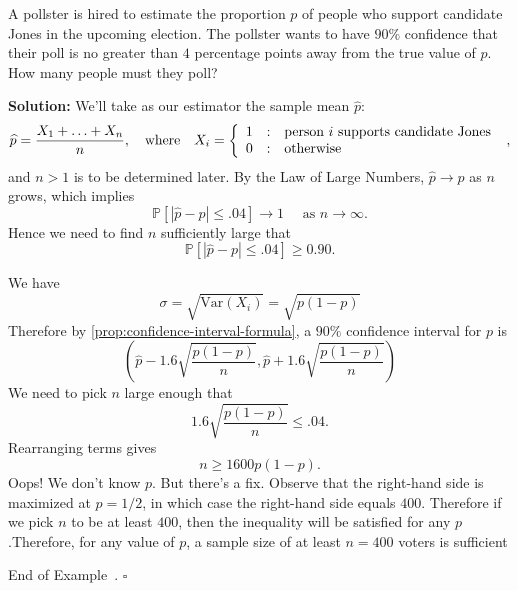 \documentclass[10pt]{article}
\theoremstyle{definition}
\newtheorem{example}[theorem]{Example}
\renewenvironment{example}
{\begin{oldexample}}
  {\par\smallskip\hfill   End of Example~\theexample. $\square$    \par\end{oldexample}}
\newcommand{\vt}{\vskip 5mm} %
\newcommand{\Fl}{\vt\noindent\textbf} %
\newcommand{\1}[1]{\textbf{1}_{\left[#1\right]}} %
\def\P{\mathbb{P}} %
\def\Var{\mathrm{Var}} %
\begin{document}
\begin{example}
  A pollster is hired to estimate the proportion $p$ of people who support
  candidate Jones in the upcoming election. The pollster wants to have $90\%$
  confidence that their poll is no greater than $4$ percentage points away
  from the true value of $p$. How many people must they poll?

  \Fl{Solution:} We'll take as our estimator the sample mean $\widehat{p}$:
  \begin{equation*}
    \widehat{p}=\frac{X_{1}+\ldots+X_{n}}{n},
    \quad \text{where} \quad 
    X_{i} = \left\{ \begin{array}{l@{\quad:\quad}l} 1 & \text{person $i$
          supports candidate Jones }\\0 &\text{otherwise} \end{array}\right.,
  \end{equation*}
  and $n>1$ is to be determined later. By the Law of Large Numbers,
  $\widehat{p} \to p$ as $n$ grows, which implies
  \begin{equation*}
    \P\left[|\widehat{p}-p| \leq .04\right] \to 1 \quad \text{ as $n \to \infty$}.
  \end{equation*}
  Hence we need to find $n$ sufficiently large that
  \begin{equation*}
    \P\left[|\widehat{p}-p| \leq .04\right] \geq 0.90.
  \end{equation*}

  We have
  \begin{equation*}
    \sigma = \sqrt{\Var(X_{i})} = \sqrt{p(1-p)}
  \end{equation*}
  Therefore by \cref{prop:confidence-interval-formula}, a $90\%$ confidence
  interval for $p$ is
  \begin{equation*}
    \left( \widehat{p} -1.6 \sqrt{\frac{p(1-p)}{n}}, \widehat{p} +1.6 \sqrt{\frac{p(1-p)}{n}} \right) 
  \end{equation*}
  We need to pick $n$ large enough that
  \begin{equation*}
    1.6 \sqrt{\frac{p(1-p)}{n}}\leq .04.
  \end{equation*}
  Rearranging terms gives
  \begin{equation*}
    n \geq 1600 p(1-p).
  \end{equation*}
  Oops! We don't know $p$. But there's a fix. Observe that the right-hand side
  is maximized at $p=1/2$, in which case the right-hand side equals $400$.
  Therefore if we pick $n$ to be at least $400$, then the inequality will be
  satisfied for any $p$.Therefore, for any value of $p$, a sample size of at
  least $n=400$ voters is sufficient


\end{example}
\end{document}
